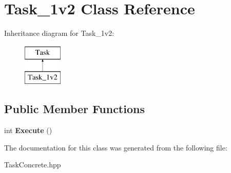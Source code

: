\hypertarget{classTask__1v2}{\section{\-Task\-\_\-1v2 \-Class \-Reference}
\label{classTask__1v2}
}
\-Inheritance diagram for \-Task\-\_\-1v2\-:\begin{figure}[H]
\begin{center}
\leavevmode
\includegraphics[height=2.000000cm]{classTask__1v2}
\end{center}
\end{figure}
\subsection*{\-Public \-Member \-Functions}
\begin{DoxyCompactItemize}
\item 
\hypertarget{classTask__1v2_a32f4a518dd5a563042eac977ff6c2f8b}{int {\bfseries \-Execute} ()}\label{classTask__1v2_a32f4a518dd5a563042eac977ff6c2f8b}

\end{DoxyCompactItemize}


\-The documentation for this class was generated from the following file\-:\begin{DoxyCompactItemize}
\item 
\-Task\-Concrete.\-hpp\end{DoxyCompactItemize}

